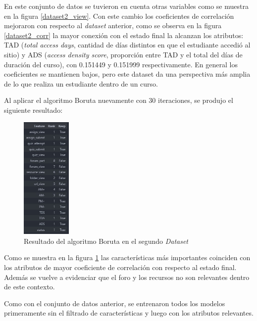 En este conjunto de datos se tuvieron en cuenta otras variables como se muestra en la figura \ref{dataset2_view}. Con este cambio los coeficientes de correlación mejoraron con respecto al \textit{dataset} anterior, como se observa en la 
figura \ref{dataset2_corr} la mayor conexión con el estado final la alcanzan los atributos: TAD (\textit{total access days}, cantidad de días distintos en que el estudiante accedió al sitio) y 
ADS (\textit{access density score}, proporción entre TAD y el total del días de duración del curso), con 0.151449 y 0.151999 respectivamente. 
En general los coeficientes se mantienen bajos, pero este dataset da una perspectiva más amplia de lo que realiza un estudiante dentro de un curso.

Al aplicar el algoritmo Boruta nuevamente con 30 iteraciones, se produjo el siguiente resultado: 


\begin{figure}[htb]
    \centering
    \includegraphics[height=6cm]{Graphics/boruta_dataset2.jpg}
    \caption{Resultado del algoritmo Boruta en el segundo \textit{Dataset}}
    \label{boruta2}
\end{figure} 

Como se muestra en la figura \ref{boruta2} las características más importantes coinciden con los atributos de mayor coeficiente de correlación con respecto al estado final. Además se vuelve a evidenciar que el foro y los recursos no son relevantes dentro de este contexto. 


Como con el conjunto de datos anterior, se entrenaron todos los modelos primeramente sin el filtrado de características y luego con los atributos relevantes.  


